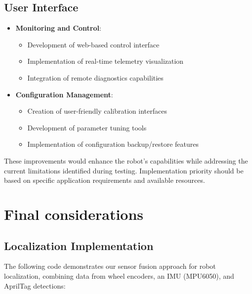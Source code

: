 \documentclass{article}
\begin{document}
\subsection{User Interface}
\begin{itemize}
    \item \textbf{Monitoring and Control}:
        \begin{itemize}
            \item Development of web-based control interface
            \item Implementation of real-time telemetry visualization
            \item Integration of remote diagnostics capabilities
        \end{itemize}
    
    \item \textbf{Configuration Management}:
        \begin{itemize}
            \item Creation of user-friendly calibration interfaces
            \item Development of parameter tuning tools
            \item Implementation of configuration backup/restore features
        \end{itemize}
\end{itemize}

These improvements would enhance the robot's capabilities while addressing the current limitations identified during testing. Implementation priority should be based on specific application requirements and available resources.

\newpage
\section{Final considerations}

\subsection{Localization Implementation}
The following code demonstrates our sensor fusion approach for robot localization, combining data from wheel encoders, an IMU (MPU6050), and AprilTag detections:
\end{document}
